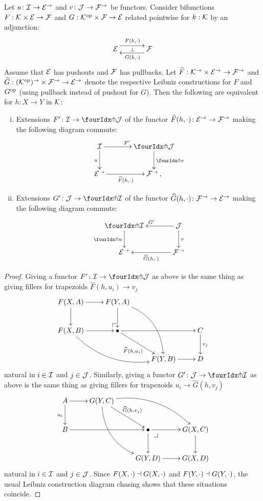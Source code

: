 \documentclass[reqno,10pt,a4paper,oneside]{amsart}
\begin{document}
\begin{proposition}
\label{lift-of-leibniz-adjunction}
Let $u \co \cal{I} \to \cal{E}^{\to}$ and $v \co \cal{J} \to \cal{F}^{\to}$ be functors.
Consider bifunctions $F : \cal{K} \times \cal{E} \to \cal{F}$ and $G : \cal{K}^{\op} \times \cal{F} \to \cal{E}$ related pointwise for $k : \cal{K}$ by an adjunction:
\[
\xymatrix@C+1em{
  \cal{E}
  \ar@<5pt>[r]^{F(k, \arghole)}
  \ar@{}[r]|{\bot}
&
  \cal{F}
  \ar@<5pt>[l]^{G(k, \arghole)}
}
\]
Assume that $\cal{E}$ has pushouts and $\cal{F}$ has pullbacks.
Let $\widehat{F} : \cal{K}^{\to} \times \cal{E}^{\to} \to \cal{F}^{\to}$ and $\widehat{G} : (\cal{K}^{\op})^{\to} \times \cal{F}^{\to} \to \cal{E}^{\to}$ denote the respective Leibniz constructions for $F$ and $G^{\op}$ (using pullback instead of pushout for $G$).
Then the following are equivalent for $h : X \to Y$ in $\cal{K}$:
\begin{enumerate}[(i)]
\item Extensions $F' \co \cal{I} \to \liftl{\cal{J}}$ of the functor $\widehat{F}(h, \arghole) \co \cal{E}^\to \to \cal{F}^\to$ making the following diagram commute:
\[
\xymatrix@C=1.2cm{
  \cal{I}
  \ar[r]^{F'}
  \ar[d]_{u}
&
  \liftl{\cal{J}}
  \ar[d]^{\liftl{v}}
\\
  \cal{E}^{\to}
  \ar[r]_-{\widehat{F}(h, \arghole)}
&
  \cal{F}^{\to}\, ,}
\]
\item Extensions $G' \co \cal{J} \to \liftr{\cal{I}}$ of the functor $\widehat{G}(h, \arghole) \co \cal{F}^\to \to \cal{E}^\to$  making the following diagram commute:
\[
\xymatrix@C=1.2cm{
  \liftr{\cal{I}}
  \ar[d]_{\liftr{u}}
&
  \cal{J}
  \ar[l]_{G'} 
  \ar[d]^{v}
\\
  \cal{E}^{\to}
&
  \cal{F}^{\to}
  \ar[l]^-{\widehat{G}(h, \arghole)}
}
\]
\end{enumerate}
\end{proposition}

\begin{proof}
Giving a functor $F' \co \cal{I} \to \liftl{\cal{J}}$ as above is the same thing as giving fillers for trapezoids $\widehat{F}(h, u_i) \to v_j$
\[
\xymatrix{
  F(X, A)
  \ar[r]
  \ar[d]
&
  F(Y, A)
  \ar[d]
  \ar@/^2em/[ddr]
\\
  F(X, B)
  \ar[r]
  \ar@/_2em/[drr]
&
  \bullet
  \ar[dr]_{\widehat{F}(h, u_i)}
  \ar[rr]
  \pullback{ul}
&&
  C \ar[d]^{v_j}
\\&&
  F(Y, B)
  \ar[r]
&
  D
}
\]
natural in $i \in \cal{I}$ and $j \in \cal{J}$.
Similarly, giving a functor $G' \co \cal{J} \to \liftl{\cal{I}}$ as above is the same thing as giving fillers for trapezoids $u_i \to \widehat{G}(h, v_j)$
\[
\xymatrix{
  A
  \ar[d]_{u_i}
  \ar[r]
&
  G(Y, C)
  \ar[dr]^{\widehat{G}(h, v_j)}
  \ar@/_2em/[ddr]
  \ar@/^2em/[drr]
\\
  B
  \ar[rr]
&&
  \bullet
  \ar[r]
  \ar[d]
  \pullback{dr}
&
  G(X, C)
  \ar[d]
\\&&
  G(Y, D)
  \ar[r]
&
  G(X, D)
}
\]
natural in $i \in \cal{I}$ and $j \in \cal{J}$.
Since $F(X, \arghole) \dashv G(X, \arghole)$ and $F(Y, \arghole) \dashv G(Y, \arghole)$, the usual Leibniz construction diagram chasing shows that these situations coincide.
\end{proof}
\end{document}
